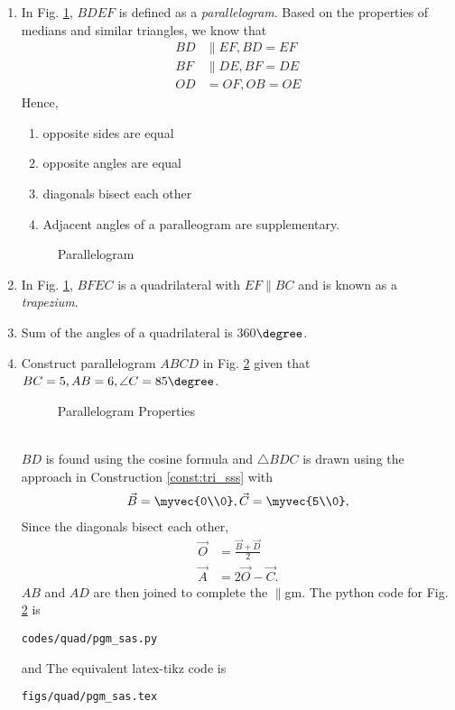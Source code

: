 \renewcommand{\theequation}{\theenumi}
\begin{enumerate}[label=\arabic*.,ref=\thesubsection.\theenumi]
\item In Fig. 	\ref{fig:tri_med_pgm}, 	$BDEF$ is defined as a {\em parallelogram}. Based on the properties of medians and similar triangles, we know that
\label{them:pgm_basic}
%
\begin{align}
BD &\parallel EF, BD = EF
\\
BF &\parallel DE, BF = DE
\\
OD &= OF, OB = OE
\end{align} 
Hence, 
\begin{enumerate}
\item opposite sides are equal 
\item  opposite angles are equal
\item  diagonals bisect each other
\item Adjacent angles of a paralleogram are supplementary.
\end{enumerate}
%
\begin{figure}[!ht]
	\begin{center}
		\resizebox{\columnwidth}{!}{}
	\end{center}
	\caption{Parallelogram}
	\label{fig:tri_med_pgm}	
\end{figure}
%
\item In Fig. 	\ref{fig:tri_med_pgm}, $BFEC$ is a quadrilateral with $EF \parallel BC$ and is known as a {\em trapezium}.
\item Sum of the angles of a quadrilateral is 360$\degree$. 
\item Construct parallelogram $ABCD$ 	in Fig. \ref{fig:pgm_sas}	
given that  $BC = 5, AB = 6, \angle C = 85 \degree$.
\begin{figure}[!ht]
	\begin{center}
		\resizebox{\columnwidth}{!}{}
	\end{center}
	\caption{Parallelogram Properties}
	\label{fig:pgm_sas}	
\end{figure}
%
\\
\solution $BD$ is found using the cosine formula and $\triangle BDC$ is drawn using the approach in Construction \ref{const:tri_sss} with 
%
\begin{align}
\vec{B} = \myvec{0\\0},
\vec{C} = \myvec{5\\0},
\end{align}
%
Since the diagonals bisect each other, 
%
\begin{align}
\vec{O} &= \frac{\vec{B}+\vec{D}}{2}
\\
\vec{A} &= 2\vec{O} - \vec{C}.
\end{align}
%
$AB$ and $AD$ are then joined to complete the $\parallel$gm.
The python code for  Fig. \ref{fig:pgm_sas} is
\begin{lstlisting}
codes/quad/pgm_sas.py
\end{lstlisting}
%
and 
The equivalent latex-tikz code is
%
\begin{lstlisting}
figs/quad/pgm_sas.tex
\end{lstlisting}
%


\end{enumerate}
